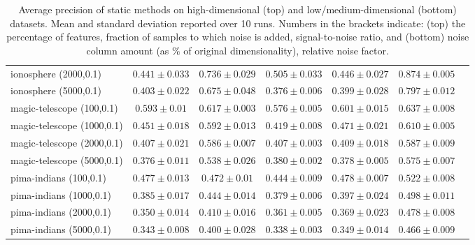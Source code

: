 \begin{footnotesize}
\begin{table}[p!]
\begin{tabular}{lcccccc}
ionosphere (2000,0.1)     & $0.441 \pm 0.033$ &  $0.736 \pm 0.029$ &  $0.505 \pm 0.033$ &  $0.446 \pm 0.027$ & $0.874 \pm  0.005$ \\
ionosphere (5000,0.1)     & $0.403 \pm 0.022$ &  $0.675 \pm 0.048$ &  $0.376 \pm 0.006$ &  $0.399 \pm 0.028$ & $0.797 \pm  0.012$  \\
\midrule
magic-telescope (100,0.1) & $0.593 \pm 0.01$  &  $0.617 \pm 0.003$ &  $0.576 \pm 0.005$ &  $0.601 \pm 0.015$ & $0.637 \pm  0.008$ \\
magic-telescope (1000,0.1)& $0.451 \pm 0.018$ &  $0.592 \pm 0.013$ &  $0.419 \pm 0.008$ &  $0.471 \pm 0.021$ & $0.610 \pm  0.005$ \\
magic-telescope (2000,0.1)& $0.407 \pm 0.021$ &  $0.586 \pm 0.007$ &  $0.407 \pm 0.003$ &  $0.409 \pm 0.018$ & $0.587 \pm  0.009$ \\
magic-telescope (5000,0.1)& $0.376 \pm 0.011$ &  $0.538 \pm 0.026$ &  $0.380 \pm 0.002$ &  $0.378 \pm 0.005$ & $0.575 \pm  0.007$ \\
\midrule
pima-indians (100,0.1)    & $0.477 \pm 0.013$ &  $0.472 \pm 0.01$  &  $0.444 \pm 0.009$ &  $0.478 \pm 0.007$ & $0.522 \pm  0.008$ \\
pima-indians (1000,0.1)   & $0.385 \pm 0.017$ &  $0.444 \pm 0.014$ &  $0.379 \pm 0.006$ &  $0.397 \pm 0.024$ & $0.498 \pm  0.011$ \\
pima-indians (2000,0.1)   & $0.350 \pm 0.014$ &  $0.410 \pm 0.016$ &  $0.361 \pm 0.005$ &  $0.369 \pm 0.023$ & $0.478 \pm  0.008$ \\
pima-indians (5000,0.1)   & $0.343 \pm 0.008$ &  $0.400 \pm 0.028$ &  $0.338 \pm 0.003$ &  $0.349 \pm 0.014$ & $0.466 \pm  0.009$ \\
				\bottomrule
		\end{tabular}
		\caption{Average precision of static methods on high-dimensional (top) and low/medium-dimensional (bottom) datasets. Mean and standard deviation reported over 10 runs. Numbers in the brackets indicate: (top) the percentage of features, fraction of samples to which noise is added, signal-to-noise ratio, and (bottom) noise column amount (as $\%$ of original dimensionality), relative noise factor.}
\end{table}
\end{footnotesize}


